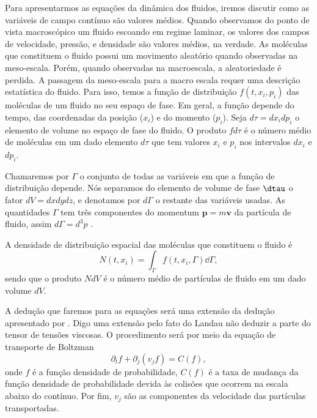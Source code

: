 Para apresentarmos as equações da dinâmica dos fluidos, iremos discutir como as variáveis de campo contínuo são valores médios. Quando observamos do ponto de vista macroscópico um fluido escoando em regime laminar, os valores dos campos de velocidade, pressão, e densidade são valores médios, na verdade. As moléculas que constituem o fluido possui um movimento aleatório quando observadas na meso-escala. Porém, quando observadas na macroescala, a aleatoriedade é perdida. A passagem da meso-escala para a macro escala requer uma descrição estatística do fluido. Para isso, temos a função de distribuição $f(t, x_i, p_i)$ das moléculas de um fluido no seu espaço de fase. Em geral, a função depende do tempo, das coordenadas da posição ($x_i$) e do momento ($p_i$). Seja $d\tau = dx_{i}dp_i$ o elemento de volume no espaço de fase do fluido. O produto $fd\tau$ é o número médio de moléculas em um dado elemento $d\tau$ que tem valores $x_i$ e $p_i$ nos intervalos $dx_i$ e $dp_i$. 

Chamaremos por $\Gamma$ o conjunto de todas as variáveis em que a função de distribuição depende. Nós separamos do elemento de volume de fase $\dtau$ o fator $dV = dxdydz$, e denotamos por $d\Gamma$ o restante das variáveis usadas. As quantidades $\Gamma$ tem três componentes do momentum $\textbf{p} = m\textbf{v}$ da partícula de fluido, assim $d\Gamma = d^{3}p$ \cite{pitaevskii2012physical}.

A densidade de distribuição espacial das moléculas que constituem o fluido é
\begin{equation}
    N(t, x_{i}) = \int_{\Gamma} f(t, x_{i}, \Gamma) \dd\Gamma,
\end{equation}
sendo que o produto $NdV$ é o número médio de partículas de fluido em um dado volume $dV$.

A dedução que faremos para as equações será uma extensão da dedução apresentado por \cite{pitaevskii2012physical}. Digo uma extensão pelo fato do Landau não deduzir a parte do tensor de tensões viscosas. O procedimento será por meio da equação de transporte de Boltzman \cite{landau2013course}
\begin{equation}\label{boltzman_eq}
    \partial_{t} f + \partial_{j}(v_{j}f) = C(f),
\end{equation}
onde $f$ é a função densidade de probabilidade, $C(f)$ é a taxa de mudança da função densidade de probabilidade devida às colisões que ocorrem na escala abaixo do contínuo. Por fim, $v_{j}$ são as componentes da velocidade das partículas transportadas.

